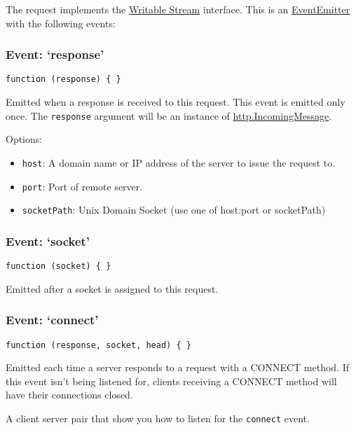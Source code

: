The request implements the
\href{stream.html\#stream_class_stream_writable}{Writable Stream}
interface. This is an
\href{events.html\#events_class_events_eventemitter}{EventEmitter} with
the following events:

\subsubsection{Event: `response'}\label{event-response}

\texttt{function (response) \{ \}}

Emitted when a response is received to this request. This event is
emitted only once. The \texttt{response} argument will be an instance of
\hyperref[httpux5fhttpux5fincomingmessage]{http.IncomingMessage}.

Options:

\begin{itemize}
\itemsep1pt\parskip0pt
\item
  \texttt{host}: A domain name or IP address of the server to issue the
  request to.
\item
  \texttt{port}: Port of remote server.
\item
  \texttt{socketPath}: Unix Domain Socket (use one of host:port or
  socketPath)
\end{itemize}

\subsubsection{Event: `socket'}\label{event-socket}

\texttt{function (socket) \{ \}}

Emitted after a socket is assigned to this request.

\subsubsection{Event: `connect'}\label{event-connect-1}

\texttt{function (response, socket, head) \{ \}}

Emitted each time a server responds to a request with a CONNECT method.
If this event isn't being listened for, clients receiving a CONNECT
method will have their connections closed.

A client server pair that show you how to listen for the
\texttt{connect} event.


